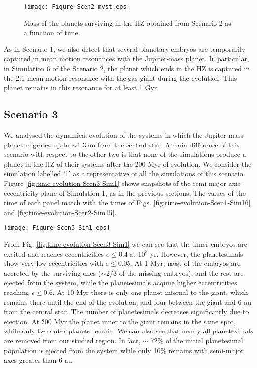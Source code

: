 \documentclass{aa}
\begin{document}
\begin{figure}[htb!]
 \centering
\texttt{[image: Figure\_Scen2\_mvst.eps]}
 \caption{
 Mass of the planets surviving in the HZ obtained from Scenario 2 as a function of time.
 }
 \label{fig:masa_t-Scen2}
\end{figure}

As in Scenario 1, we also detect that several planetary embryos are temporarily captured in mean motion resonances with the Jupiter-mass planet.
In particular, in Simulation 6 of the Scenario 2, the planet which ends in the HZ is captured in the 2:1 mean motion resonance with the gas giant
during the evolution. This planet remains in this resonance for at least 1 Gyr.

\subsection{Scenario 3}
\label{sect:scenario3}

We analysed the dynamical evolution of the systems in which the Jupiter-mass planet migrates up to $\sim 1.3$ au from the central star.
A main difference of this scenario with respect to the other two is that none of the simulations produce a planet in the HZ
of their systems after the 200 Myr of evolution. We consider the simulation labelled '1' as a representative of all the simulations
of this scenario. Figure \ref{fig:time-evolution-Scen3-Sim1} shows snapshots of the semi-major axis-eccentricity plane of Simulation 1,
as in the previous sections. The values of the time of each panel match with the times of Figs. \ref{fig:time-evolution-Scen1-Sim16}
and \ref{fig:time-evolution-Scen2-Sim15}.

\begin{figure*}[htb!]
 \centering
\texttt{[image: Figure\_Scen3\_Sim1.eps]}
 \caption{Snapshots of the dynamical evolution for Simulation 1 of Scenario 3. The colour code description is analogous to that of Fig. \ref{fig:time-evolution-Scen1-Sim16}.}
\label{fig:time-evolution-Scen3-Sim1}
\end{figure*}

From Fig. \ref{fig:time-evolution-Scen3-Sim1} we can see that the inner embryos are excited and reaches eccentricities $e \leq 0.4$ at $10^5$ yr.
However, the planetesimals show very low eccentricities with $e \leq 0.05$. At 1 Myr, most of the embryos are accreted by the
surviving ones ($\sim 2/3$ of the missing embryos), and the rest are ejected from the system, while the planetesimals acquire higher
eccentricities reaching $e \leq 0.6$. At 10 Myr there is only one planet internal to the giant, which remains there until the end of
the evolution, and four between the giant and 6 au from the central star. The number of planetesimals decreases significantly due to ejection. At 200 
Myr the planet inner to the giant remains in the same spot, while only two outer planets remain. We can also see that nearly all
planetesimals are removed from our studied region. In fact, $\sim$ 72\% of the initial planetesimal population is ejected from the system
while only 10\% remains with semi-major axes greater than 6 au.
\end{document}
